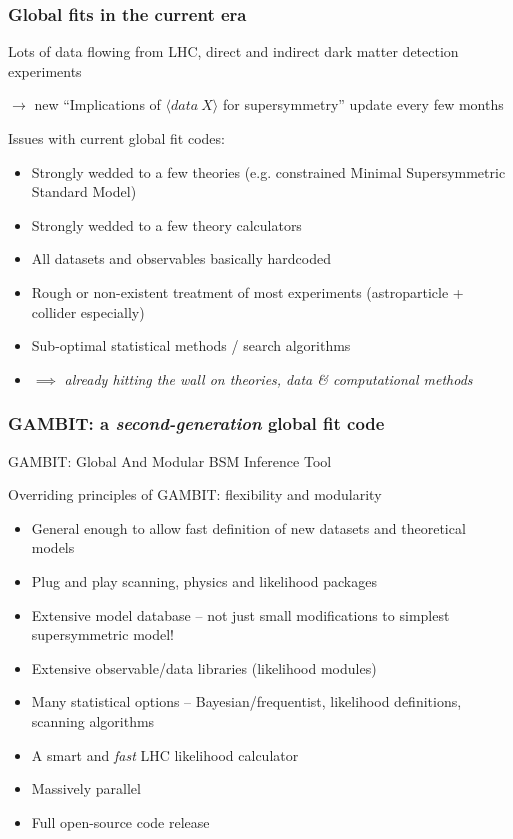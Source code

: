 \documentclass[xcolor=dvipsnames]{beamer}
\begin{document}
\begin{frame}
\frametitle{Global fits in the current era}

Lots of data flowing from LHC, direct and indirect dark matter detection experiments\vspace{3mm}

$\rightarrow$ new ``Implications of $\langle data\ X\rangle$ for supersymmetry'' update every few months\vspace{5mm}

Issues with current global fit codes:
\begin{itemize}
\item Strongly wedded to a few theories (e.g. constrained Minimal Supersymmetric Standard Model)
\item Strongly wedded to a few theory calculators
\item All datasets and observables basically hardcoded
\item Rough or non-existent treatment of most experiments (astroparticle + collider especially)
\item Sub-optimal statistical methods / search algorithms
\item $\implies$ \textit{already hitting the wall on theories, data \& computational methods}
\end{itemize}

\end{frame}



\begin{frame}
\frametitle{\textbf{GAMBIT}: a \textit{second-generation} global fit code}

GAMBIT: \alert{G}lobal \alert{A}nd \alert{M}odular \alert{B}SM \alert{I}nference \alert{T}ool
\vspace{5mm}

Overriding principles of GAMBIT: flexibility and modularity
\begin{itemize}
\item General enough to allow fast definition of new datasets and theoretical models
\item Plug and play scanning, physics and likelihood packages
\item Extensive model database -- not just small modifications to simplest supersymmetric model!
\item Extensive observable/data libraries (likelihood modules)
\item Many statistical options -- Bayesian/frequentist, likelihood definitions, scanning algorithms
\item A smart and \textit{fast} LHC likelihood calculator
\item Massively parallel
\item Full open-source code release
\end{itemize}

\end{frame}
\end{document}
